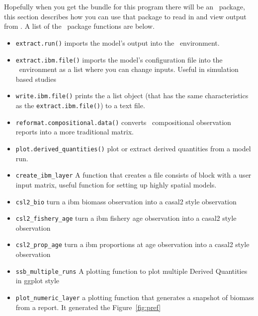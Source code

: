 \section{ \label{sec:post-processing}}

Hopefully when you get the bundle for this program there will be an \R\ package, this section describes how you can use that package to read in and view output from \IBM.  A list of the \R\ package functions are below.

\begin{itemize}
	\item \texttt{extract.run()} imports the model's output into the \R\ environment.
	\item \texttt{extract.ibm.file()} imports the model's configuration file into the \R\ environment as a list where you can change inputs. Useful in simulation based studies
	\item \texttt{write.ibm.file()} prints the a list object (that has the same characteristics as the \texttt{extract.ibm.file()})	to a text file.
	\item \texttt{reformat.compositional.data()} converts \IBM\ compositional observation reports into a more traditional matrix.
	\item \texttt{plot.derived\_quantities()} plot or extract derived quantities from a model run.
	\item \texttt{create\_ibm\_layer} A function that creates a file consists of  block with a user input matrix, useful function for setting up highly spatial models.
	\item \texttt{csl2\_bio} turn a ibm biomass observation into a casal2 style observation
	\item \texttt{csl2\_fishery\_age} turn a ibm fishery age observation into a casal2 style observation	
	\item \texttt{csl2\_prop\_age} turn a ibm proportions at age observation into a casal2 style observation
	\item \texttt{ssb\_multiple\_runs} A plotting function to plot multiple Derived Quantities in ggplot style
	\item \texttt{plot\_numeric\_layer} a plotting function that generates a snapshot of biomass from a  report. It generated the Figure~\ref{fig:pref}
\end{itemize}



